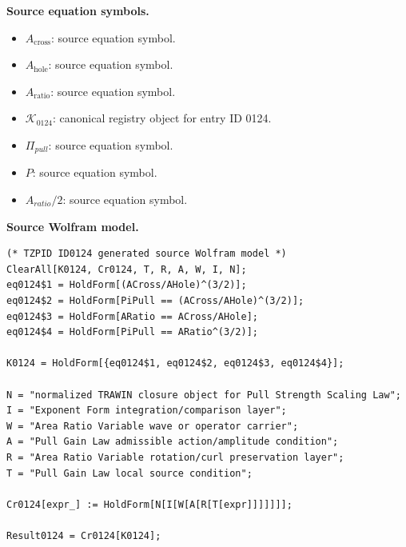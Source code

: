 \begin{minipage}[t]{0.49\linewidth}
\begingroup
\small
\raggedright
\textbf{Source equation symbols.}\par
\begin{itemize}[leftmargin=1.35em,itemsep=1pt,topsep=1pt,parsep=0pt]
    \item $A_{\mathrm{cross}}$: source equation symbol.
    \item $A_{\mathrm{hole}}$: source equation symbol.
    \item $A_{\mathrm{ratio}}$: source equation symbol.
    \item $\mathcal{K}_{0124}$: canonical registry object for entry ID 0124.
    \item $\Pi_{pull}$: source equation symbol.
    \item $P$: source equation symbol.
    \item $A_{ratio}/2$: source equation symbol.
\end{itemize}
\endgroup
\end{minipage}\hfill
\begin{minipage}[t]{0.47\linewidth}
\begingroup
\scriptsize
\raggedright
\textbf{Source Wolfram model.}\par
\begin{Verbatim}[fontsize=\tiny,breaklines=true,breakanywhere=true]
(* TZPID ID0124 generated source Wolfram model *)
ClearAll[K0124, Cr0124, T, R, A, W, I, N];
eq0124$1 = HoldForm[(ACross/AHole)^(3/2)];
eq0124$2 = HoldForm[PiPull == (ACross/AHole)^(3/2)];
eq0124$3 = HoldForm[ARatio == ACross/AHole];
eq0124$4 = HoldForm[PiPull == ARatio^(3/2)];

K0124 = HoldForm[{eq0124$1, eq0124$2, eq0124$3, eq0124$4}];

N = "normalized TRAWIN closure object for Pull Strength Scaling Law";
I = "Exponent Form integration/comparison layer";
W = "Area Ratio Variable wave or operator carrier";
A = "Pull Gain Law admissible action/amplitude condition";
R = "Area Ratio Variable rotation/curl preservation layer";
T = "Pull Gain Law local source condition";

Cr0124[expr_] := HoldForm[N[I[W[A[R[T[expr]]]]]]];

Result0124 = Cr0124[K0124];
\end{Verbatim}
\endgroup
\end{minipage}

